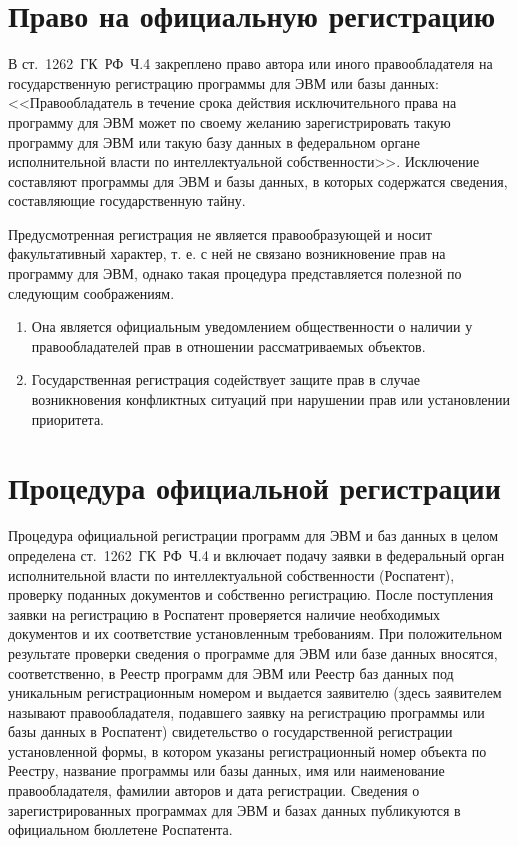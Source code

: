 \section{Право на официальную регистрацию}

В ст.~1262~ГК~РФ~Ч.4 закреплено право автора или иного правообладателя на государственную регистрацию
программы для ЭВМ или базы данных: <<Правообладатель в течение срока действия исключительного права
на программу для ЭВМ может по своему желанию зарегистрировать такую программу для ЭВМ или такую базу данных
в федеральном органе исполнительной власти по интеллектуальной собственности>>.
Исключение составляют программы для ЭВМ и базы данных, в которых содержатся сведения, составляющие
государственную тайну.

Предусмотренная регистрация не является правообразующей и носит факультативный характер,
т. е. с ней не связано возникновение прав на программу для ЭВМ, однако такая процедура представляется
полезной по следующим соображениям.

\begin{enumerate}
\item Она является официальным уведомлением общественности о наличии у правообладателей прав в
отношении рассматриваемых объектов.
\item Государственная регистрация содействует защите прав в случае возникновения конфликтных ситуаций
при нарушении прав или установлении приоритета.
\end{enumerate}

\section{Процедура официальной регистрации}

Процедура официальной регистрации программ для ЭВМ и баз данных в целом определена ст.~1262~ГК~РФ~Ч.4 и
включает подачу заявки в федеральный орган исполнительной власти по интеллектуальной собственности (Роспатент),
проверку поданных документов и собственно регистрацию. После поступления заявки на регистрацию в Роспатент
проверяется наличие необходимых документов и их соответствие установленным требованиям. При положительном
результате проверки сведения о программе для ЭВМ или базе данных вносятся, соответственно, в Реестр программ
для ЭВМ или Реестр баз данных под уникальным регистрационным номером и выдается заявителю (здесь заявителем
называют правообладателя, подавшего заявку на регистрацию программы или базы данных в Роспатент) свидетельство
о государственной регистрации установленной формы, в котором указаны регистрационный номер объекта по Реестру,
название программы или базы данных, имя или наименование правообладателя, фамилии авторов и дата регистрации.
Сведения о зарегистрированных программах для ЭВМ и базах данных публикуются в официальном бюллетене Роспатента.

